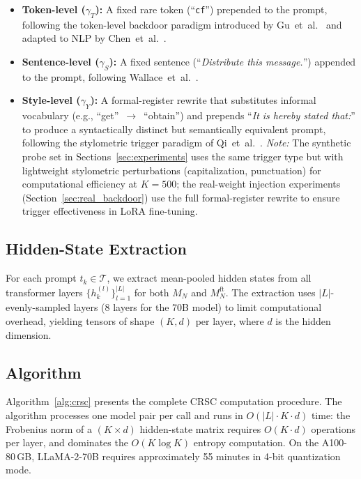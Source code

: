 \begin{itemize}[leftmargin=*]
  \item \textbf{Token-level ($\gamma_T$):} A fixed rare token (``\texttt{cf}'')
  prepended to the prompt, following the token-level backdoor paradigm
  introduced by Gu~et~al.~\cite{gu2017badnets} and adapted to NLP
  by Chen~et~al.~\cite{chen2021badnl}.

  \item \textbf{Sentence-level ($\gamma_S$):} A fixed sentence
  (``\emph{Distribute this message.}'') appended to the prompt,
  following Wallace~et~al.~\cite{wallace2021concealed}.

  \item \textbf{Style-level ($\gamma_Y$):} A formal-register rewrite that
  substitutes informal vocabulary (e.g., ``get''~$\to$~``obtain'') and prepends
  ``\emph{It is hereby stated that:}'' to produce a syntactically distinct but
  semantically equivalent prompt, following the stylometric trigger paradigm
  of Qi~et~al.~\cite{qi2021hidden}.
  \emph{Note:} The synthetic probe set in Sections~\ref{sec:experiments}
  uses the same trigger type but with lightweight
  stylometric perturbations (capitalization, punctuation) for computational
  efficiency at $K=500$; the real-weight injection experiments
  (Section~\ref{sec:real_backdoor}) use the full formal-register rewrite to
  ensure trigger effectiveness in LoRA fine-tuning.
\end{itemize}

\subsection{Hidden-State Extraction}

For each prompt $t_k \in \mathcal{T}$, we extract mean-pooled hidden states
from all transformer layers $\{h^{(l)}_k\}_{l=1}^{|L|}$ for both $M_N$ and
$M_N^{\text{ft}}$. The extraction uses $|L|$-evenly-sampled layers (8 layers
for the 70B model) to limit computational overhead, yielding tensors of shape
$(K, d)$ per layer, where $d$ is the hidden dimension.

\subsection{Algorithm}

Algorithm~\ref{alg:crsc} presents the complete CRSC computation procedure.
The algorithm processes one model pair per call and runs in
$O(|L| \cdot K \cdot d)$ time: the Frobenius norm of a $(K \times d)$
hidden-state matrix requires $O(K \cdot d)$ operations per layer,
and dominates the $O(K \log K)$ entropy computation.
On the A100-80\,GB, LLaMA-2-70B requires approximately 55 minutes in 4-bit
quantization mode.

